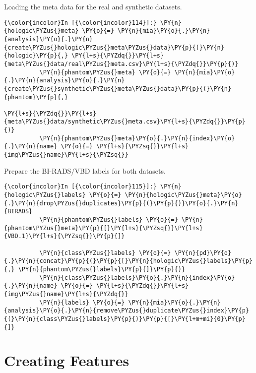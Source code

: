     Loading the meta data for the real and synthetic datasets.

    \begin{Verbatim}[commandchars=\\\{\}]
{\color{incolor}In [{\color{incolor}114}]:} \PY{n}{hologic\PYZus{}meta} \PY{o}{=} \PY{n}{mia}\PY{o}{.}\PY{n}{analysis}\PY{o}{.}\PY{n}{create\PYZus{}hologic\PYZus{}meta\PYZus{}data}\PY{p}{(}\PY{n}{hologic}\PY{p}{,} \PY{l+s}{\PYZdq{}}\PY{l+s}{meta\PYZus{}data/real\PYZus{}meta.csv}\PY{l+s}{\PYZdq{}}\PY{p}{)}
          \PY{n}{phantom\PYZus{}meta} \PY{o}{=} \PY{n}{mia}\PY{o}{.}\PY{n}{analysis}\PY{o}{.}\PY{n}{create\PYZus{}synthetic\PYZus{}meta\PYZus{}data}\PY{p}{(}\PY{n}{phantom}\PY{p}{,}
                                                                 \PY{l+s}{\PYZdq{}}\PY{l+s}{meta\PYZus{}data/synthetic\PYZus{}meta.csv}\PY{l+s}{\PYZdq{}}\PY{p}{)}
          \PY{n}{phantom\PYZus{}meta}\PY{o}{.}\PY{n}{index}\PY{o}{.}\PY{n}{name} \PY{o}{=} \PY{l+s}{\PYZsq{}}\PY{l+s}{img\PYZus{}name}\PY{l+s}{\PYZsq{}}
\end{Verbatim}

    Prepare the BI-RADS/VBD labels for both datasets.

    \begin{Verbatim}[commandchars=\\\{\}]
{\color{incolor}In [{\color{incolor}115}]:} \PY{n}{hologic\PYZus{}labels} \PY{o}{=} \PY{n}{hologic\PYZus{}meta}\PY{o}{.}\PY{n}{drop\PYZus{}duplicates}\PY{p}{(}\PY{p}{)}\PY{o}{.}\PY{n}{BIRADS}
          \PY{n}{phantom\PYZus{}labels} \PY{o}{=} \PY{n}{phantom\PYZus{}meta}\PY{p}{[}\PY{l+s}{\PYZsq{}}\PY{l+s}{VBD.1}\PY{l+s}{\PYZsq{}}\PY{p}{]}

          \PY{n}{class\PYZus{}labels} \PY{o}{=} \PY{n}{pd}\PY{o}{.}\PY{n}{concat}\PY{p}{(}\PY{p}{[}\PY{n}{hologic\PYZus{}labels}\PY{p}{,} \PY{n}{phantom\PYZus{}labels}\PY{p}{]}\PY{p}{)}
          \PY{n}{class\PYZus{}labels}\PY{o}{.}\PY{n}{index}\PY{o}{.}\PY{n}{name} \PY{o}{=} \PY{l+s}{\PYZdq{}}\PY{l+s}{img\PYZus{}name}\PY{l+s}{\PYZdq{}}
          \PY{n}{labels} \PY{o}{=} \PY{n}{mia}\PY{o}{.}\PY{n}{analysis}\PY{o}{.}\PY{n}{remove\PYZus{}duplicate\PYZus{}index}\PY{p}{(}\PY{n}{class\PYZus{}labels}\PY{p}{)}\PY{p}{[}\PY{l+m+mi}{0}\PY{p}{]}
\end{Verbatim}

    \section{Creating Features}\label{creating-features}

